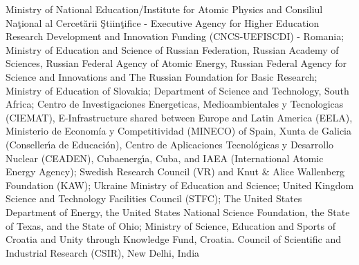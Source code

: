 %
Ministry of National Education/Institute for Atomic Physics and Consiliul Naţional al Cercetării Ştiinţifice - Executive Agency for Higher Education Research Development and Innovation Funding (CNCS-UEFISCDI) - Romania;
%
Ministry of Education and Science of Russian Federation, Russian
Academy of Sciences, Russian Federal Agency of Atomic Energy,
Russian Federal Agency for Science and Innovations and The Russian
Foundation for Basic Research;
%
Ministry of Education of Slovakia;
%
Department of Science and Technology, South Africa;
%
Centro de Investigaciones Energeticas, Medioambientales y Tecnologicas (CIEMAT), E-Infrastructure shared between Europe and Latin America (EELA), Ministerio de Econom\'{i}a y Competitividad (MINECO) of Spain, Xunta de Galicia (Conseller\'{\i}a de Educaci\'{o}n),
Centro de Aplicaciones Tecnológicas y Desarrollo Nuclear (CEA\-DEN), Cubaenerg\'{\i}a, Cuba, and IAEA (International Atomic Energy Agency);
%
Swedish Research Council (VR) and Knut $\&$ Alice Wallenberg
Foundation (KAW);
%
Ukraine Ministry of Education and Science;
%
United Kingdom Science and Technology Facilities Council (STFC);
%
The United States Department of Energy, the United States National
Science Foundation, the State of Texas, and the State of Ohio;
%
Ministry of Science, Education and Sports of Croatia and  Unity through Knowledge Fund, Croatia.
%
Council of Scientific and Industrial Research (CSIR), New Delhi, India
